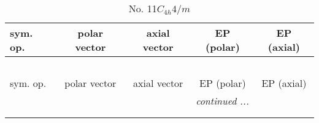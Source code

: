 \documentclass[fleqn,10pt,landscape]{jsarticle}
\begin{document}
\begin{center}
\renewcommand{\arraystretch}{1.3}
\begin{longtable}{lcccc}
\caption{No. 11\quad$C_{4h}$\quad$4/m$\quad[ tetragonal ]}
 \\
 \hline \hline
sym. op. & polar vector & axial vector & EP (polar) & EP (axial) \\ \hline \endfirsthead

\multicolumn{4}{l}{\tablename\ \thetable{}} \\
 \hline \hline
sym. op. & polar vector & axial vector & EP (polar) & EP (axial) \\ \hline \endhead

 \hline \hline
\multicolumn{4}{r}{\footnotesize\it continued ...} \\ \endfoot

 \hline \hline
\multicolumn{4}{r}{} \\ \endlastfoot


\end{longtable}
\end{center}
\end{document}
